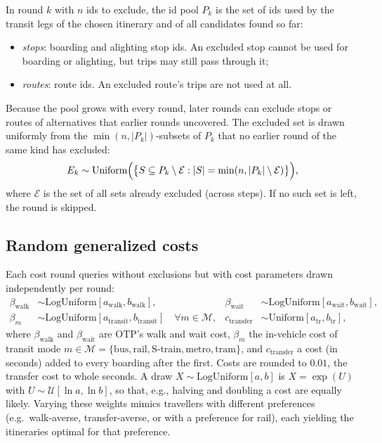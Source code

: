 \documentclass[11pt,a4paper]{article}
\begin{document}
In round $k$ with $n$ ids to exclude, the id pool $P_k$ is the set of ids used by the transit legs of
the chosen itinerary and of all candidates found so far:
\begin{itemize}
  \item \emph{stops}: boarding and alighting stop ids. An excluded stop cannot be used for boarding or
    alighting, but trips may still pass through it;
  \item \emph{routes}: route ids. An excluded route's trips are not used at all.
\end{itemize}
Because the pool grows with every round, later rounds can exclude stops or routes of alternatives
that earlier rounds uncovered. The excluded set is drawn uniformly from the $\min(n, |P_k|)$-subsets
of $P_k$ that no earlier round of the same kind has excluded:
\begin{equation}
  E_k \sim \text{Uniform} \Bigl(\bigl\{ S \subseteq P_k \setminus \mathcal{E}: |S| = \min(n,|P_k|\setminus \mathcal{E}) \bigr\} \Bigr),
\end{equation}
where $\mathcal{E}$ is the set of all sets already excluded (across steps). If no such set is left,
the round is skipped.


\subsection{Random generalized costs}

Each cost round queries without exclusions but with cost parameters drawn independently per round:
\begin{align}
  \beta_{\text{walk}} &\sim \text{LogUniform}[a_{\text{walk}}, b_{\text{walk}}], &
  \beta_{\text{wait}} &\sim \text{LogUniform}[a_{\text{wait}}, b_{\text{wait}}], \\
  \beta_{m} &\sim \text{LogUniform}[a_{\text{transit}}, b_{\text{transit}}] \quad \forall m \in \mathcal{M}, &
  c_{\text{transfer}} &\sim \text{Uniform}[a_{\text{tr}}, b_{\text{tr}}],
\end{align}
where $\beta_{\text{walk}}$ and $\beta_{\text{wait}}$ are OTP's walk and wait cost, $\beta_m$ the in-vehicle cost of transit mode $m \in \mathcal{M} = \{\text{bus}, \text{rail}, \text{S-train}, \text{metro}, \text{tram}\}$, and $c_{\text{transfer}}$ a cost (in seconds) added to every boarding after the first. Costs are rounded to $0.01$, the transfer cost to whole seconds. 
A draw $X \sim \text{LogUniform}[a,b]$ is $X = \exp(U)$ with $U \sim \mathcal{U}[\ln a, \ln b]$, so that, e.g., halving and doubling a cost are equally likely. Varying these weights mimics travellers with different preferences (e.g.\ walk-averse, transfer-averse, or with a preference for rail), each yielding the itineraries optimal for that preference.
\end{document}
